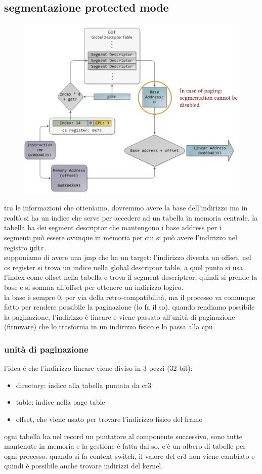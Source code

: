 \documentclass[12pt, oneside]{extbook} %
\begin{document}
\subsection{segmentazione protected mode}
\begin{figure}[!h]
	\includegraphics[scale=0.3]{immagini/seg_prot_mode.png}
\end{figure}
tra le informazioni che otteniamo, dovremmo avere la base dell'indirizzo ma in realtà si ha un indice che serve per accedere ad un tabella in memoria centrale. la tabella ha dei segment descriptor che mantengono i base address per i segmenti,può essere ovunque in memoria per cui si può avere l'indirizzo nel registro \texttt{gdtr}.\\supponiamo di avere una jmp che ha un target: l'indirizzo diventa un offset, nel cs register si trova un indice nella global descriptor table. a quel punto si usa l'index come offset nella tabella e trova il segment descriptror, quindi si prende la base e si somma all'offset per ottenere un indirizzo logico.\\ la base è sempre 0, per via della retro-compatibilità, ma il processo va comunque fatto per rendere possibile la paginazione (lo fa il so). quando rendiamo possibile la paginazione, l'indirizzo è lineare e viene passato all'unità di paginazione (firmware) che lo trasforma in un indirizzo fisico e lo passa alla cpu
\subsubsection{unità di paginazione}
l'idea è che l'indirizzo lineare viene diviso in 3 pezzi (32 bit):
\begin{itemize}
\item directory: indice alla tabella puntata da cr3
\item table: indice nella page table
\item offset, che viene usato per trovare l'indirizzo fisico del frame
\end{itemize}
ogni tabella ha nel record un puntatore al componente successivo, sono tutte mantenute in memoria e la gestione è fatta dal so. c'è un albero di tabelle per ogni processo. quando si fa context switch, il valore del cr3 non viene cambiato e quindi è possibile anche trovare indirizzi del kernel.
\end{document}
